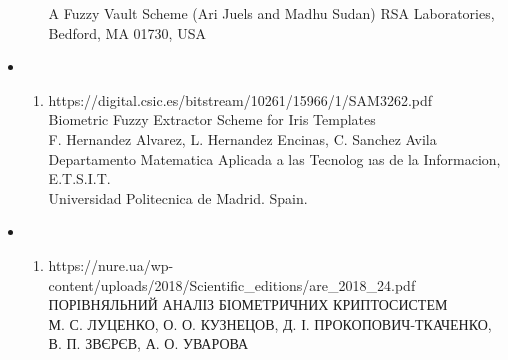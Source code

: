\documentclass[11pt]{article}
\providecommand{\tightlist}{%
      \setlength{\itemsep}{0pt}\setlength{\parskip}{0pt}}
\begin{document}
\begin{itemize}
\begin{enumerate}
    A Fuzzy Vault Scheme (Ari Juels and Madhu Sudan) RSA Laboratories,
    Bedford, MA 01730, USA
  \end{enumerate}
\item
  \begin{enumerate}
  \def\labelenumi{(\arabic{enumi})}
  \setcounter{enumi}{5}
  \tightlist
  \item
    https://digital.csic.es/bitstream/10261/15966/1/SAM3262.pdf\\
    Biometric Fuzzy Extractor Scheme for Iris Templates\\
    F. Hernandez Alvarez, L. Hernandez Encinas, C. Sanchez Avila\\
    Departamento Matematica Aplicada a las Tecnolog ıas de la
    Informacion, E.T.S.I.T.\\
    Universidad Politecnica de Madrid. Spain.
  \end{enumerate}
\item
  \begin{enumerate}
  \def\labelenumi{(\arabic{enumi})}
  \setcounter{enumi}{6}
  \tightlist
  \item
    https://nure.ua/wp-content/uploads/2018/Scientific\_editions/are\_2018\_24.pdf\\
    ПОРІВНЯЛЬНИЙ АНАЛІЗ БІОМЕТРИЧНИХ КРИПТОСИСТЕМ\\
    М. С. ЛУЦЕНКО, О. О. КУЗНЕЦОВ, Д. І. ПРОКОПОВИЧ-ТКАЧЕНКО, В. П.
    ЗВЄРЄВ, А. О. УВАРОВА
  \end{enumerate}
\end{itemize}


    
    
    
\end{document}
